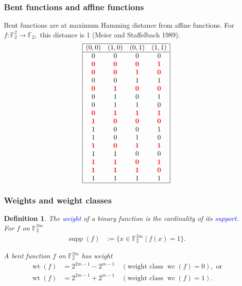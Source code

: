 \documentclass[pdf,sprung,slideColor,nocolorBG]{beamer}
\newenvironment{colortheme}[1]{
\def\ProvidesPackageRCS $##1${\relax}
\renewcommand{\ProcessOptions}{\relax}
\makeatletter

\makeatother
}{}
\newcommand{\slidecite}[1]{\tiny{(#1)}\normalsize{}}
\newcommand{\mb}[1]{\mathbb{#1}}
\newcommand{\Emph}[1]{\emph{\textcolor{blue}{#1}}}
\newcommand{\Red}[1]{\mathbf{\textcolor{red}{#1}}}
\newcommand{\To}{\rightarrow}
\newcommand{\Cay}[1]{\operatorname{Cay}\left(#1\right)}
\newcommand{\support}[1]{\operatorname{supp}\left(#1\right)}
\newcommand{\weight}[1]{\operatorname{wt}\left(#1\right)}
\newcommand{\weightclass}[1]{\operatorname{wc}\left(#1\right)}
\newcommand{\F}{\mb{F}}
\newtheorem{Def}{Definition}
\begin{document}
\begin{colortheme}{seagull}
\begin{frame}
\frametitle{Bent functions and affine functions}
Bent functions are at maximum Hamming distance from affine functions.
For $f : \F_2^2 \To \F_2,$ this distance is 1 \slidecite{Meier and Staffelbach 1989}.
\scriptsize{}
\begin{align*}
\begin{array}{|cccc|}
\hline
(0,0)& (1,0)& (0,1)& (1,1)
\\
\hline
0 & 0 & 0 & 0
\\
\Red{0}& \Red{0} & \Red{0} & \Red{1}
\\
\Red{0}& \Red{0} & \Red{1} & \Red{0}
\\
0 & 0 & 1 & 1
\\
\Red{0}& \Red{1} & \Red{0} & \Red{0}
\\
0 & 1 & 0 & 1
\\
0 & 1 & 1 & 0
\\
\Red{0}& \Red{1} & \Red{1} & \Red{1}
\\
\Red{1}& \Red{0} & \Red{0} & \Red{0}
\\
1 & 0 & 0 & 1
\\
1 & 0 & 1 & 0
\\
\Red{1}& \Red{0} & \Red{1} & \Red{1}
\\
1 & 1 & 0 & 0
\\
\Red{1}& \Red{1} & \Red{0} & \Red{1}
\\
\Red{1}& \Red{1} & \Red{1} & \Red{0}
\\
1 & 1 & 1 & 1
\\
\hline
\end{array}
\end{align*}
\normalsize{}
\end{frame}

\end{colortheme}

\begin{colortheme}{jubata}

\begin{frame}
\frametitle{Weights and weight classes}
\begin{Def}
The \Emph{weight} of a binary function is the cardinality of its \Emph{support}.
For $f$ on $\F_2^{2m}$
\begin{align*}
\support{f} &:= \{x \in \F_2^{2m} \mid f(x)=1 \}.
\end{align*}

A bent function $f$ on $\F_2^{2m}$ has weight
\begin{align*}
\weight{f} &= 2^{2 m - 1} - 2^{m-1} \quad (\text{weight class~} \weightclass{f}=0), \text{~or}
\\
\weight{f} &= 2^{2 m - 1} + 2^{m-1} \quad (\text{weight class~} \weightclass{f}=1).
\end{align*}
\end{Def}
\end{frame}

\end{colortheme}
\end{document}
